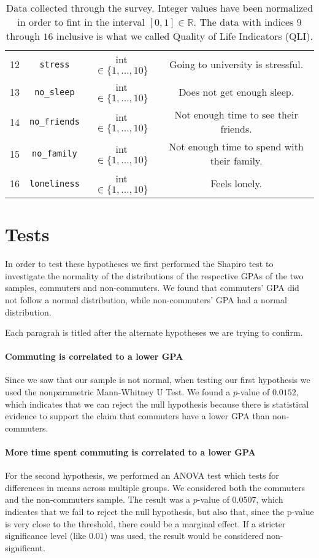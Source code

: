 \documentclass[11pt]{extarticle}
\numberwithin{table}{section}
\numberwithin{figure}{section}
\newcommand{\R}{\mathds{R}}
\numberwithin{equation}{section}
\begin{document}
\begin{table}[!ht]
\begin{tabular}{|c|c|c|c|}
		12         & \texttt{stress}                  & int $\in \{1, \dots, 10\}$ & Going to university is stressful.                   \\
		13         & \texttt{no\_sleep}               & int $\in \{1, \dots, 10\}$ & Does not get enough sleep.                          \\
		14         & \texttt{no\_friends}             & int $\in \{1, \dots, 10\}$ & Not enough time to see their friends.               \\
		15         & \texttt{no\_family}              & int $\in \{1, \dots, 10\}$ & Not enough time to spend with their family.         \\
		16         & \texttt{loneliness}              & int $\in \{1, \dots, 10\}$ & Feels lonely.                                       \\
		\hline
	\end{tabular}
	\caption{
		Data collected through the survey.
		Integer values have been normalized in order to fint in the interval $[0,1] \in \R$.
		The data with indices $9$ through $16$ inclusive is what we called Quality of Life Indicators (QLI).
	}
	\label{table:data}
\end{table}

\section{Tests}
\label{sec:tests}

In order to test these hypotheses we first performed the Shapiro test to investigate the normality
of the distributions of the respective GPAs of the two samples, commuters and non-commuters.
We found that commuters’ GPA did not follow a normal distribution, while non-commuters' GPA
had a normal distribution.

Each paragrah is titled after the alternate hypotheses we are trying to confirm.

\paragraph{Commuting is correlated to a lower GPA}
Since we saw that our sample is not normal,
when testing our first hypothesis we used the nonparametric Mann-Whitney U Test.
We found a $p$-value of $0.0152$, which indicates that we can reject the null hypothesis because
there is statistical evidence to support the claim that commuters have a lower GPA than non-commuters.

\paragraph{More time spent commuting is correlated to a lower GPA}
For the second hypothesis, we performed an ANOVA test
which tests for differences in means across multiple groups.
We considered both the commuters and the non-commuters sample.
The result was a $p$-value of $0.0507$, which indicates that we fail to reject the null hypothesis,
but also that, since the p-value is very close to the threshold, there could be a marginal effect.
If a stricter significance level (like $0.01$) was used,
the result would be considered non-significant.
\end{document}
